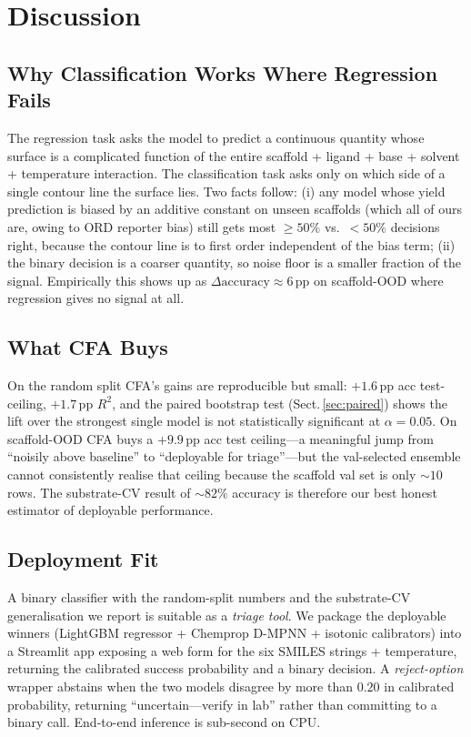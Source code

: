 \documentclass[conference]{IEEEtran}
\begin{document}
\section{Discussion}
\label{sec:discussion}

\subsection{Why Classification Works Where Regression Fails}
The regression task asks the model to predict a continuous quantity
whose surface is a complicated function of the entire scaffold + ligand
+ base + solvent + temperature interaction. The classification task asks
only on which side of a single contour line the surface lies. Two facts
follow: (i) any model whose yield prediction is biased by an additive
constant on unseen scaffolds (which all of ours are, owing to ORD reporter
bias) still gets most $\geq\!50\%$ vs.\ $<\!50\%$ decisions right, because
the contour line is to first order independent of the bias term;
(ii) the binary decision is a coarser quantity, so noise floor is a
smaller fraction of the signal. Empirically this shows up as
$\Delta\mathrm{accuracy}\!\approx\!6$\,pp on scaffold-OOD where regression
gives no signal at all.

\subsection{What CFA Buys}
On the random split CFA's gains are reproducible but small: $+1.6$\,pp acc
test-ceiling, $+1.7$\,pp $R^{2}$, and the paired bootstrap test
(Sect.\,\ref{sec:paired}) shows the lift over the strongest single model
is not statistically significant at $\alpha\!=\!0.05$. On scaffold-OOD CFA
buys a $+9.9$\,pp acc test ceiling---a meaningful jump from ``noisily
above baseline'' to ``deployable for triage''---but the val-selected
ensemble cannot consistently realise that ceiling because the scaffold val
set is only $\sim$$10$ rows. The substrate-CV result of $\sim$$82\%$
accuracy is therefore our best honest estimator of deployable
performance.

\subsection{Deployment Fit}
A binary classifier with the random-split numbers and the substrate-CV
generalisation we report is suitable as a \emph{triage tool}. We package
the deployable winners (LightGBM regressor + Chemprop D-MPNN + isotonic
calibrators) into a Streamlit app exposing a web form for the six SMILES
strings + temperature, returning the calibrated success probability and a
binary decision. A \emph{reject-option} wrapper abstains when the two
models disagree by more than $0.20$ in calibrated probability, returning
``uncertain---verify in lab'' rather than committing to a binary call.
End-to-end inference is sub-second on CPU.
\end{document}
